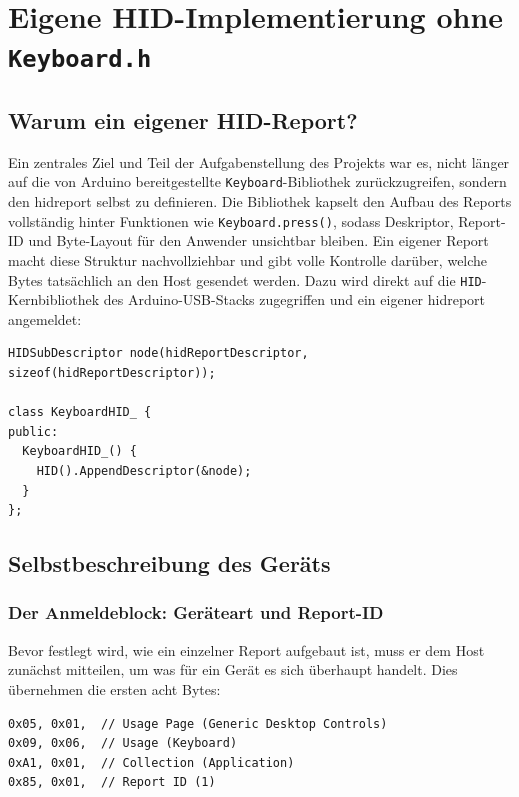 \documentclass{article}
\begin{document}
\section{Eigene HID-Implementierung ohne \texttt{Keyboard.h}}




\subsection{Warum ein eigener HID-Report?}
Ein zentrales Ziel und Teil der Aufgabenstellung des Projekts war es, nicht länger auf die von Arduino bereitgestellte \texttt{Keyboard}-Bibliothek zurückzugreifen, sondern den \gls{hidreport} selbst zu definieren. Die Bibliothek kapselt den Aufbau des Reports vollständig hinter Funktionen wie \texttt{Keyboard.press()}, sodass Deskriptor, Report-ID und Byte-Layout für den Anwender unsichtbar bleiben. Ein eigener Report macht diese Struktur nachvollziehbar und gibt volle Kontrolle darüber, welche Bytes tatsächlich an den Host gesendet werden. Dazu wird direkt auf die \texttt{HID}-Kernbibliothek des Arduino-USB-Stacks zugegriffen und ein eigener \gls{hidreport} angemeldet:

\begin{lstlisting}[style=arduino]
HIDSubDescriptor node(hidReportDescriptor, sizeof(hidReportDescriptor));

class KeyboardHID_ {
public:
  KeyboardHID_() {
    HID().AppendDescriptor(&node);
  }
};
\end{lstlisting}

\subsection{Selbstbeschreibung des Geräts}
\subsubsection{Der Anmeldeblock: Geräteart und Report-ID}
Bevor festlegt wird, wie ein einzelner Report aufgebaut ist, muss er dem Host zunächst mitteilen, um was für ein Gerät es sich überhaupt handelt. Dies übernehmen die ersten acht Bytes:

\begin{lstlisting}[style=arduino]
0x05, 0x01,  // Usage Page (Generic Desktop Controls)
0x09, 0x06,  // Usage (Keyboard)
0xA1, 0x01,  // Collection (Application)
0x85, 0x01,  // Report ID (1)
\end{lstlisting}
\end{document}
